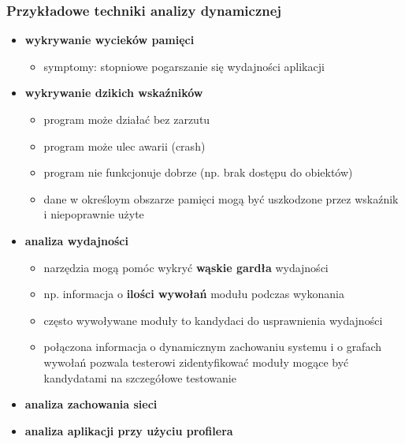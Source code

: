 \documentclass[../main.tex]{subfiles}
\begin{document}
    \subsubsection{Przykładowe techniki analizy dynamicznej}
    \begin{itemize}
        \item \textbf{wykrywanie wycieków pamięci}
        \begin{itemize}
            \item symptomy: stopniowe pogarszanie się wydajności aplikacji
        \end{itemize}
        \item \textbf{wykrywanie dzikich wskaźników}
        \begin{itemize}
            \item program może działać bez zarzutu
            \item program może ulec awarii (crash)
            \item program nie funkcjonuje dobrze (np. brak dostępu do obiektów)
            \item dane w określoym obszarze pamięci mogą być uszkodzone przez wskaźnik i niepoprawnie użyte
        \end{itemize}

        \item \textbf{analiza wydajności}
        \begin{itemize}
            \item narzędzia mogą pomóc wykryć \textbf{wąskie gardła} wydajności
            \item np. informacja o \textbf{ilości wywołań} modułu podczas wykonania
            \item często wywoływane moduły to kandydaci do usprawnienia wydajności
            \item połączona informacja o dynamicznym zachowaniu systemu i o grafach
            wywołań pozwala testerowi zidentyfikować moduły mogące być kandydatami na szczegółowe testowanie
        \end{itemize}

        \item \textbf{analiza zachowania sieci}
        \item \textbf{analiza aplikacji przy użyciu profilera}
    \end{itemize}
\end{document}
